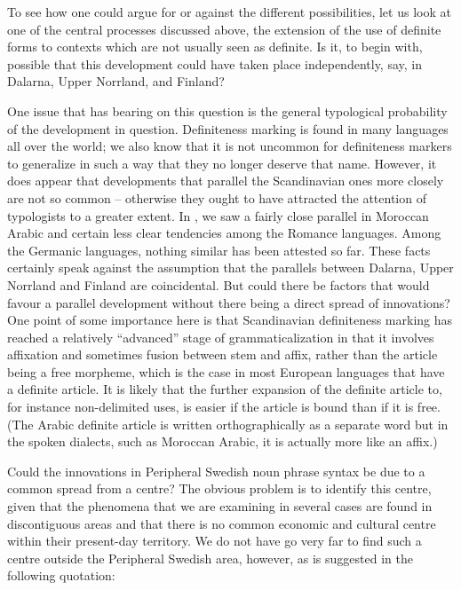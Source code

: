 

To see how one could argue for or against the different possibilities, let us look at one of the central processes discussed above, the extension of the use of definite forms to contexts which are not usually seen as definite. Is it, to begin with, possible that this development could have taken place independently, say, in Dalarna, Upper Norrland, and Finland? 




One issue that has bearing on this question is the general typological probability of the development in question. Definiteness marking is found in many languages all over the world; we also know that it is not uncommon for definiteness markers to generalize in such a way that they no longer deserve that name. However, it does appear that developments that parallel the Scandinavian ones more closely are not so common – otherwise they ought to have attracted the attention of typologists to a greater extent. In , we saw a fairly close parallel in Moroccan Arabic and certain less clear tendencies among the Romance languages. Among the Germanic languages, nothing similar has been attested so far. These facts certainly speak against the assumption that the parallels between Dalarna, Upper Norrland and Finland are coincidental. But could there be factors that would favour a parallel development without there being a direct spread of innovations? One point of some importance here is that Scandinavian definiteness marking has reached a relatively “advanced” stage of grammaticalization in that it involves affixation and sometimes fusion between stem and affix, rather than the article being a free morpheme, which is the case in most European languages that have a definite article. It is likely that the further expansion of the definite article to, for instance non-delimited uses, is easier if the article is bound than if it is free. (The Arabic definite article is written orthographically as a separate word but in the spoken dialects, such as Moroccan Arabic, it is actually more like an affix.) 




Could the innovations in Peripheral Swedish noun phrase syntax be due to a common spread from a centre? The obvious problem is to identify this centre, given that the phenomena that we are examining in several cases are found in discontiguous areas and that there is no common economic and cultural centre within their present-day territory. We do not have go very far to find such a centre outside the Peripheral Swedish area, however, as is suggested in the following quotation: 



